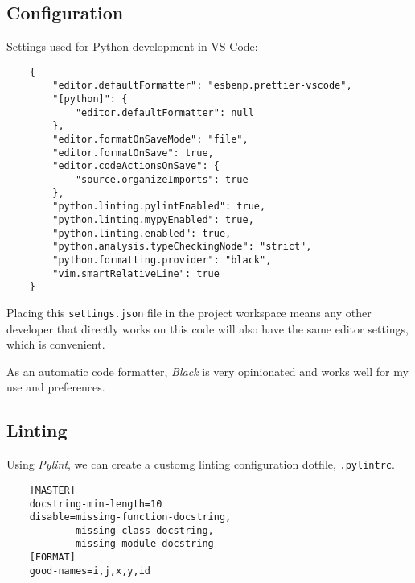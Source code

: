\subsection{Configuration}

Settings used for Python development in VS Code:

\begin{verbatim}
    {
        "editor.defaultFormatter": "esbenp.prettier-vscode",
        "[python]": {
            "editor.defaultFormatter": null
        },
        "editor.formatOnSaveMode": "file",
        "editor.formatOnSave": true,
        "editor.codeActionsOnSave": {
            "source.organizeImports": true
        },
        "python.linting.pylintEnabled": true,
        "python.linting.mypyEnabled": true,
        "python.linting.enabled": true,
        "python.analysis.typeCheckingNode": "strict",
        "python.formatting.provider": "black",
        "vim.smartRelativeLine": true
    }
\end{verbatim}

Placing this \texttt{settings.json} file in the project workspace means any other developer that directly works on this code will also have the same editor settings, which is convenient.

As an automatic code formatter, \emph{Black} is very opinionated and works well for my use and preferences.

\subsection{Linting}

Using \emph{Pylint}, we can create a customg linting configuration dotfile, \texttt{.pylintrc}.

\begin{verbatim}
    [MASTER]
    docstring-min-length=10
    disable=missing-function-docstring,
            missing-class-docstring,
            missing-module-docstring
    [FORMAT]
    good-names=i,j,x,y,id
\end{verbatim}
